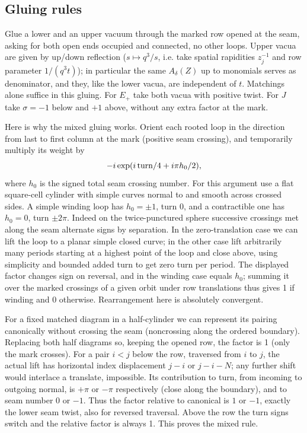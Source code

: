 \documentclass[11pt]{article}
\numberwithin{equation}{section}
\theoremstyle{definition}\newtheorem{definition}[theorem]{Definition}
\theoremstyle{remark}\newtheorem{remark}[theorem]{Remark}
\begin{document}
\subsection{Gluing rules}\label{L:step3}

Glue a lower and an upper vacuum through the marked row opened at the seam, asking for both open ends occupied and connected, no other loops. Upper vacua are given by up/down reflection (\(s\mapsto q^3/s\), i.e. take spatial rapidities \(z_j^{-1}\) and row parameter \(1/(q^3t)\)); in particular the same \(A_\delta(Z)\) up to monomials serves as denominator, and they, like the lower vacua, are independent of \(t\). Matchings alone suffice in this gluing. For \(E_+\) take both vacua with positive twist. For \(J\) take \(\sigma=-1\) below and \(+1\) above, without any extra factor at the mark.

Here is why the mixed gluing works. Orient each rooted loop in the direction from last to first column at the mark (positive seam crossing), and temporarily multiply its weight by
\[
 -i\exp(i\,{\rm turn}/4+i\pi h_0/2),
\]
where \(h_0\) is the signed total seam crossing number. For this argument use a flat square-cell cylinder with simple curves normal to and smooth across crossed sides. A simple winding loop has \(h_0=\pm1\), turn 0, and a contractible one has \(h_0=0\), turn \(\pm2\pi\). Indeed on the twice-punctured sphere successive crossings met along the seam alternate signs by separation. In the zero-translation case we can lift the loop to a planar simple closed curve; in the other case lift arbitrarily many periods starting at a highest point of the loop and close above, using simplicity and bounded added turn to get zero turn per period. The displayed factor changes sign on reversal, and in the winding case equals \(h_0\); summing it over the marked crossings of a given orbit under row translations thus gives 1 if winding and 0 otherwise. Rearrangement here is absolutely convergent.

For a fixed matched diagram in a half-cylinder we can represent its pairing canonically without crossing the seam (noncrossing along the ordered boundary). Replacing both half diagrams so, keeping the opened row, the factor is 1 (only the mark crosses). For a pair \(i<j\) below the row, traversed from \(i\) to \(j\), the actual lift has horizontal index displacement \(j-i\) or \(j-i-N\); any further shift would interlace a translate, impossible. Its contribution to turn, from incoming to outgoing normal, is \(+\pi\) or \(-\pi\) respectively (close along the boundary), and to seam number 0 or \(-1\). Thus the factor relative to canonical is \(1\) or \(-1\), exactly the lower seam twist, also for reversed traversal. Above the row the turn signs switch and the relative factor is always 1. This proves the mixed rule.
\end{document}
